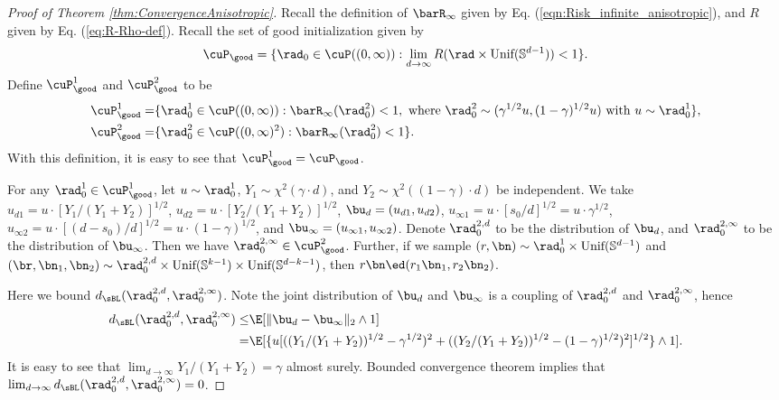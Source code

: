 \documentclass[11pt]{article}
\begin{document}
\begin{proof}[Proof of Theorem \ref{thm:ConvergenceAnisotropic}]

Recall the definition of $\barR_\infty$ given by Eq. (\ref{eqn:Risk_infinite_anisotropic}), and $R$ given by Eq. (\ref{eq:R-Rho-def}). Recall the set of good initialization given by
\[
\cuP_{\good} = \{\rad_0 \in \cuP((0, \infty)): \lim_{d \to \infty} R(\rad \times \text{Unif}(\mathbb S^{d-1})) < 1 \}.
\]
Define $\cuP_{\good}^1$ and $\cuP_{\good}^2$ to be
\begin{align}
\cuP_{\good}^1 =& \{\rad_0^1 \in \cuP( (0, \infty) ):\barR_\infty(\rad_0^2) < 1,  \text{ where } \rad_0^2 \sim (\gamma^{1/2} u, (1 - \gamma)^{1/2} u) \text{ with } u \sim \rad_0^1 \}, \\
\cuP_{\good}^2 =& \{\rad_0^2 \in \cuP((0, \infty)^2): \barR_\infty(\rad_0^2) < 1 \}.
\end{align}
With this definition, it is easy to see that $\cuP_{\good}^1 = \cuP_{\good}$. 

For any $\rad_0^1 \in \cuP_{\good}^1$, let $u \sim \rad_0^1$, $Y_1 \sim \chi^2(\gamma \cdot d)$, and $Y_2 \sim \chi^2((1 - \gamma) \cdot d)$ be independent. We take $u_{d1} = u \cdot [Y_1 / (Y_1 + Y_2)]^{1/2}$, $u_{d2} = u \cdot [Y_2 / (Y_1 + Y_2)]^{1/2}$, $\bu_d = (u_{d1}, u_{d2})$, $u_{\infty1} = u \cdot [s_0 / d]^{1/2} = u \cdot \gamma^{1/2}$, $u_{\infty2} = u \cdot [(d - s_0) / d]^{1/2} = u \cdot (1 - \gamma)^{1/2}$, and $\bu_\infty = (u_{\infty1}, u_{\infty2})$. Denote $\rad_{0}^{2, d}$ to be the distribution of $\bu_d$, and $\rad_{0}^{2, \infty}$ to be the distribution of $\bu_\infty$. Then we have $\rad_{0}^{2, \infty} \in \cuP_{\good}^2$. Further, if we sample $(r, \bn) \sim \rad_0^1 \times \text{Unif}(\mathbb S^{d-1})$ and $ (\br, \bn_1, \bn_2) \sim \rad_{0}^{2, d} \times \text{Unif}(\mathbb S^{k - 1}) \times \text{Unif}(\mathbb S^{d - k - 1})$, then $r \bn \ed (r_1 \bn_1, r_2 \bn_2)$. 

Here we bound $d_{\sBL}(\rad_{0}^{2, d}, \rad_{0}^{2, \infty})$. Note the joint distribution of $\bu_d$ and $\bu_\infty$ is a coupling of $\rad_{0}^{2, d}$ and $\rad_{0}^{2, \infty}$, hence 
\begin{equation}
\begin{aligned}
d_{\sBL}(\rad_{0}^{2, d}, \rad_{0}^{2, \infty}) \le& \E[ \| \bu_d - \bu_\infty \|_2 \wedge 1] \\
=& \E[ \{  u [ ( (Y_1/(Y_1 + Y_2))^{1/2} - \gamma^{1/2} )^2 + ( (Y_2/(Y_1 + Y_2))^{1/2} - (1-\gamma)^{1/2} )^2 ]^{1/2}  \} \wedge 1].
\end{aligned}
\end{equation}
It is easy to see that $\lim_{d \to \infty} Y_1 / (Y_1 + Y_2) = \gamma$ almost surely. Bounded convergence theorem implies that $\lim_{d \to \infty} d_{\sBL}(\rad_{0}^{2, d}, \rad_{0}^{2, \infty}) = 0$. 


\end{proof}
\end{document}
